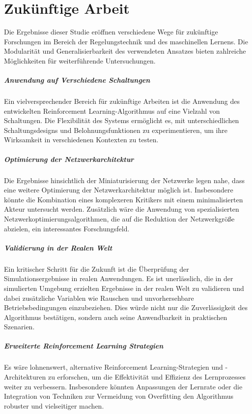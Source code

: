 \chapter{Zukünftige Arbeit}
\label{sec:Future_Work}

Die Ergebnisse dieser Studie eröffnen verschiedene Wege für zukünftige Forschungen im Bereich der Regelungstechnik und des maschinellen Lernens. Die Modularität und Generalisierbarkeit des verwendeten Ansatzes bieten zahlreiche Möglichkeiten für weiterführende Untersuchungen.

\paragraph{Anwendung auf Verschiedene Schaltungen}
Ein vielversprechender Bereich für zukünftige Arbeiten ist die Anwendung des entwickelten Reinforcement Learning-Algorithmus auf eine Vielzahl von Schaltungen. Die Flexibilität des Systems ermöglicht es, mit unterschiedlichen Schaltungsdesigns und Belohnungsfunktionen zu experimentieren, um ihre Wirksamkeit in verschiedenen Kontexten zu testen.

\paragraph{Optimierung der Netzwerkarchitektur}
Die Ergebnisse hinsichtlich der Miniaturisierung der Netzwerke legen nahe, dass eine weitere Optimierung der Netzwerkarchitektur möglich ist. Insbesondere könnte die Kombination eines komplexeren Kritikers mit einem minimalisierten Akteur untersucht werden. Zusätzlich wäre die Anwendung von spezialisierten Netzwerkoptimierungsalgorithmen, die auf die Reduktion der Netzwerkgröße abzielen, ein interessantes Forschungsfeld.

\paragraph{Validierung in der Realen Welt}
Ein kritischer Schritt für die Zukunft ist die Überprüfung der Simulationsergebnisse in realen Anwendungen. Es ist unerlässlich, die in der simulierten Umgebung erzielten Ergebnisse in der realen Welt zu validieren und dabei zusätzliche Variablen wie Rauschen und unvorhersehbare Betriebsbedingungen einzubeziehen. Dies würde nicht nur die Zuverlässigkeit des Algorithmus bestätigen, sondern auch seine Anwendbarkeit in praktischen Szenarien.

\paragraph{Erweiterte Reinforcement Learning Strategien}
Es wäre lohnenswert, alternative Reinforcement Learning-Strategien und -Architekturen zu erforschen, um die Effektivität und Effizienz des Lernprozesses weiter zu verbessern. Insbesondere könnten Anpassungen der Lernrate oder die Integration von Techniken zur Vermeidung von Overfitting den Algorithmus robuster und vielseitiger machen.

